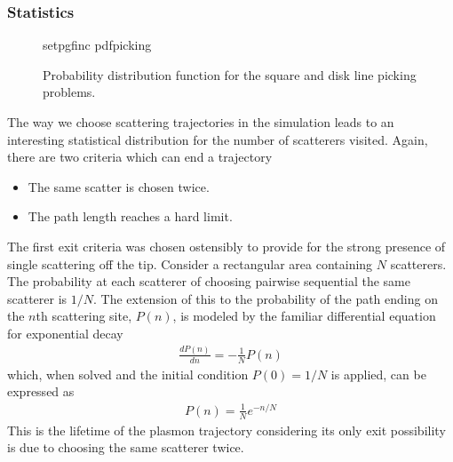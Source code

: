 \subsubsection{Statistics}
\begin{figure}[ht]
\centering
{setpgfinc}
{pdfpicking}
\caption{Probability distribution function for the square and disk line
picking problems.}
\label{fig:linepickingpdf}
\end{figure}
The way we choose scattering trajectories in the simulation leads to an
interesting statistical distribution for the number of scatterers visited.
Again, there are two criteria which can end a trajectory
\begin{itemize}
\item The same scatter is chosen twice.
\item The path length reaches a hard limit.
\end{itemize}
The first exit criteria was chosen ostensibly to provide for the strong
presence of single scattering off the tip.  Consider a rectangular area
containing $N$ scatterers.  The probability at each scatterer of choosing
pairwise sequential the same scatterer is $1/N$.  The extension of this to
the probability of the path ending on the $n$th scattering site, $P(n)$, is
modeled by the familiar differential equation for exponential decay
\begin{align}
\frac{d P(n)}{dn} = -\frac{1}{N}P(n)
\end{align}
which, when solved and the initial condition $P(0)=1/N$ is applied, can be
expressed as
\begin{align}
P(n)=\frac{1}{N}e^{-n/N}
\end{align}
This is the lifetime of the plasmon trajectory considering its only exit
possibility is due to choosing the same scatterer twice.

